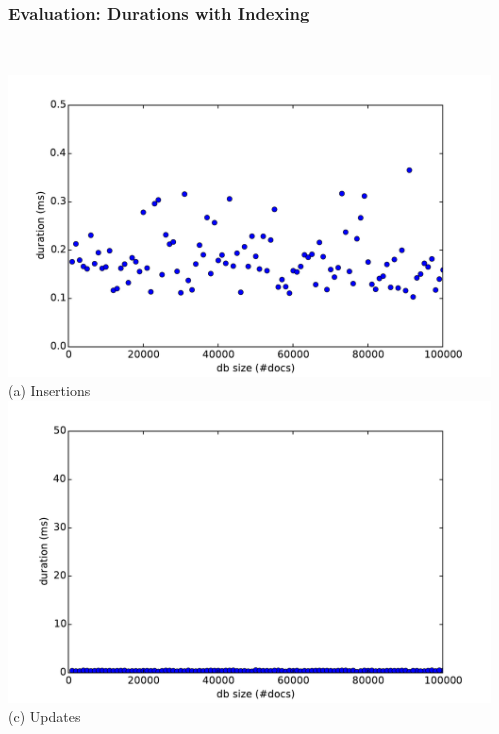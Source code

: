 \begin{frame}
  \frametitle{Evaluation: Durations with Indexing}
  \centering
  \begin{columns}
    \begin{column}{0.55\textwidth}
  \centering
    \\\vspace{-0.08cm}
    \includegraphics[width=\textwidth]{../thesis/plots/insert-durations-index}\\
    (a) Insertions
    \\\vspace{-0.08cm}
    \includegraphics[width=\textwidth]{../thesis/plots/update-durations-index}\\
    (c) Updates
    \end{column}
    \begin{column}{0.55\textwidth}
  \centering
    \\\vspace{-0.08cm}

\end{column}
\end{columns}
\end{frame}
